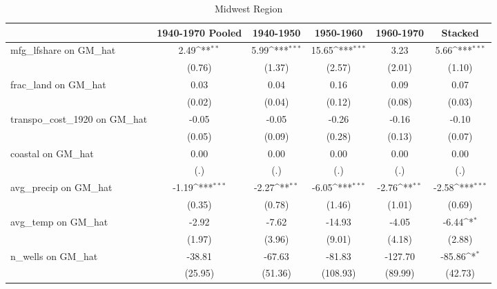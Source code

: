 \begin{table}[htbp]\centering
\def\sym#1{\ifmmode^{#1}\else\(^{#1}\)\fi}
\caption{Midwest Region}
\begin{tabular}{l*{5}{c}}
\toprule
                &\multicolumn{1}{c}{1940-1970 Pooled}&\multicolumn{1}{c}{1940-1950}&\multicolumn{1}{c}{1950-1960}&\multicolumn{1}{c}{1960-1970}&\multicolumn{1}{c}{Stacked}\\
\midrule
mfg\_lfshare on GM\_hat&     2.49\sym{**} &     5.99\sym{***}&    15.65\sym{***}&     3.23         &     5.66\sym{***}\\
                &   (0.76)         &   (1.37)         &   (2.57)         &   (2.01)         &   (1.10)         \\
\addlinespace
frac\_land on GM\_hat&     0.03         &     0.04         &     0.16         &     0.09         &     0.07         \\
                &   (0.02)         &   (0.04)         &   (0.12)         &   (0.08)         &   (0.03)         \\
\addlinespace
transpo\_cost\_1920 on GM\_hat&    -0.05         &    -0.05         &    -0.26         &    -0.16         &    -0.10         \\
                &   (0.05)         &   (0.09)         &   (0.28)         &   (0.13)         &   (0.07)         \\
\addlinespace
coastal on GM\_hat&     0.00         &     0.00         &     0.00         &     0.00         &     0.00         \\
                &      (.)         &      (.)         &      (.)         &      (.)         &      (.)         \\
\addlinespace
avg\_precip on GM\_hat&    -1.19\sym{***}&    -2.27\sym{**} &    -6.05\sym{***}&    -2.76\sym{**} &    -2.58\sym{***}\\
                &   (0.35)         &   (0.78)         &   (1.46)         &   (1.01)         &   (0.69)         \\
\addlinespace
avg\_temp on GM\_hat&    -2.92         &    -7.62         &   -14.93         &    -4.05         &    -6.44\sym{*}  \\
                &   (1.97)         &   (3.96)         &   (9.01)         &   (4.18)         &   (2.88)         \\
\addlinespace
n\_wells on GM\_hat&   -38.81         &   -67.63         &   -81.83         &  -127.70         &   -85.86\sym{*}  \\
                &  (25.95)         &  (51.36)         & (108.93)         &  (89.99)         &  (42.73)         \\

\end{tabular}
\end{table}
